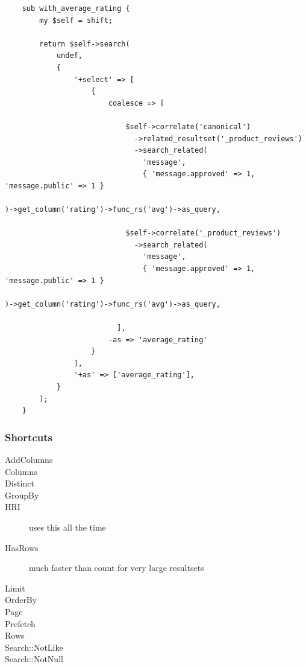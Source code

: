 \begin{lstlisting}
    sub with_average_rating {
        my $self = shift;

        return $self->search(
            undef,
            {
                '+select' => [
                    {
                        coalesce => [

                            $self->correlate('canonical')
                              ->related_resultset('_product_reviews')
                              ->search_related(
                                'message',
                                { 'message.approved' => 1,
'message.public' => 1 }
                             
)->get_column('rating')->func_rs('avg')->as_query,

                            $self->correlate('_product_reviews')
                              ->search_related(
                                'message',
                                { 'message.approved' => 1,
'message.public' => 1 }
                             
)->get_column('rating')->func_rs('avg')->as_query,

                          ],
                        -as => 'average_rating'
                    }
                ],
                '+as' => ['average_rating'],
            }
        );
    }
\end{lstlisting}

\subsubsection{Shortcuts}
\begin{description}
\item[AddColumns] 
\item[Columns]
\item[Distinct]
\item[GroupBy] 
\item[HRI]
uses this all the time
\item[HasRows] much faster than count for very large resultsets
\item[Limit]
\item[OrderBy]
\item[Page]
\item[Prefetch]
\item[Rows]
\item[Search::{Not}Like]
\item[Search::{Not}Null] 
\end{description}

